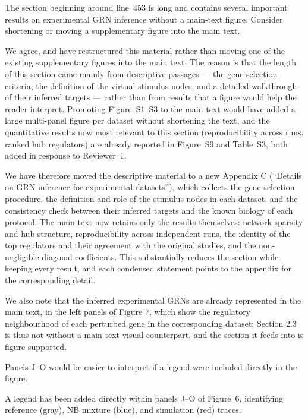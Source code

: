 \documentclass[11pt,a4paper]{article}
\newcounter{revtotal}   %
\newcounter{revlocal}   %
\newcommand{\currentreviewer}{}  %
\newcommand{\revcomment}[2]{%
  \stepcounter{revtotal}%
  \stepcounter{revlocal}%
  \edef\commentlabel{\currentreviewer.\arabic{revlocal}}%
  \begin{tcolorbox}[revstyle,
      title={\commentlabel\ $|$\ #1}]
    #2
  \end{tcolorbox}%
  \edef\lastcommentlabel{\commentlabel}%
}
\newcommand{\response}[1]{%
  \begin{tcolorbox}[respstyle,
      title={Response to \lastcommentlabel}]
    #1
  \end{tcolorbox}%
}
\begin{document}
\revcomment{Long section on experimental GRN inference without a main-text figure}{%
The section beginning around line~453 is long and contains several important results on
experimental GRN inference without a main-text figure. Consider shortening or moving a
supplementary figure into the main text.}
\response{%
We agree, and have restructured this material rather than moving one of the existing
supplementary figures into the main text. The reason is that the length of this section
came mainly from descriptive passages --- the gene selection criteria, the definition of
the virtual stimulus nodes, and a detailed walkthrough of their inferred targets --- rather
than from results that a figure would help the reader interpret. Promoting
Figure~S1--S3 to the main text would have added a large multi-panel figure per dataset
without shortening the text, and the quantitative results now most relevant to this section
(reproducibility across runs, ranked hub regulators) are already reported in
Figure~S9 and Table~S3, both added in response to Reviewer~1.

We have therefore moved the descriptive material to a new
Appendix C (``Details on GRN inference for experimental datasets''),
which collects the gene selection procedure, the definition and role of the stimulus nodes
in each dataset, and the consistency check between their inferred targets and the known
biology of each protocol. The main text now retains only the results themselves: network
sparsity and hub structure, reproducibility across independent runs, the identity of the
top regulators and their agreement with the original studies, and the non-negligible
diagonal coefficients. This substantially reduces the section while keeping every
result, and each condensed statement points to the appendix for the corresponding detail.

We also note that the inferred experimental GRNs are already represented in the main text, in the left panels of Figure 7, which show the regulatory neighbourhood of each perturbed gene in the corresponding dataset; Section 2.3 is thus not without a main-text visual counterpart, and the section it feeds into is figure-supported.
}


\revcomment{Figure~6 panels J--O: legend missing}{%
Panels J--O would be easier to interpret if a legend were included directly in the figure.}
\response{%
A legend has been added directly within panels J--O of Figure~6, identifying reference
(gray), NB mixture (blue), and simulation (red) traces.}
\end{document}
